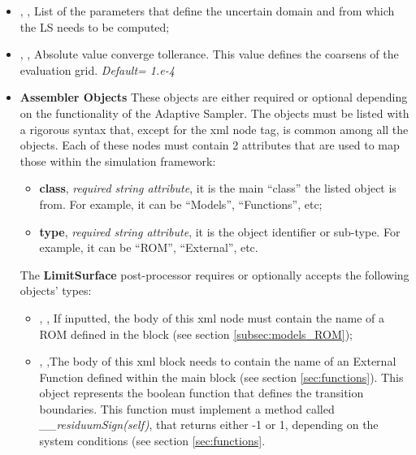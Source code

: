 \begin{itemize}
  \item {} , ,
  List of the parameters that define the uncertain domain and from which the LS
  needs to be computed;
  \item {} , ,
  Absolute value converge tollerance.
  This value defines the coarsens of the evaluation grid.
  \textit{Default= 1.e-4}
  \item \textbf{Assembler Objects} These objects are either required or optional
  depending on the functionality of the Adaptive Sampler.
  The objects must be listed with a rigorous syntax that, except for the xml
  node tag, is common among all the objects.
  Each of these nodes must contain 2 attributes that are used to map those
  within the simulation framework:
   \begin{itemize}
    \item \textbf{class}, \textit{required string attribute}, it is the main
    ``class'' the listed object is from.
    For example, it can be ``Models'', ``Functions'', etc;
    \item \textbf{type}, \textit{required string attribute}, it is the object
    identifier or sub-type.
    For example, it can be ``ROM'', ``External'', etc.
    \end{itemize}
  The \textbf{LimitSurface} post-processor requires or optionally accepts the
  following objects' types:
   \begin{itemize}
    \item {}, ,
    If inputted, the body of this xml node must contain the name of a ROM
    defined in the  block (see section \ref{subsec:models_ROM});
    \item {}, ,The body of
    this xml block needs to contain the name of an External Function defined
    within the  main block (see section \ref{sec:functions}).
    This object represents the boolean function that defines the transition
    boundaries.
    This function must implement a method called
    \textit{\_\_residuumSign(self)}, that returns either -1 or 1, depending on
    the system conditions (see section \ref{sec:functions}.
    \end{itemize}
\end{itemize}

